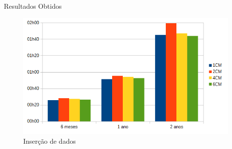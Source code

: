 \begin{frame}{Resultados Obtidos}

\begin{figure}[!htb]
	\centering
	\includegraphics[width=1\textwidth]{../figuras/graphinsert.png}
	\caption{Inserção de dados}
	\label{fig:graphinsert}
\end{figure}
  
\end{frame}

